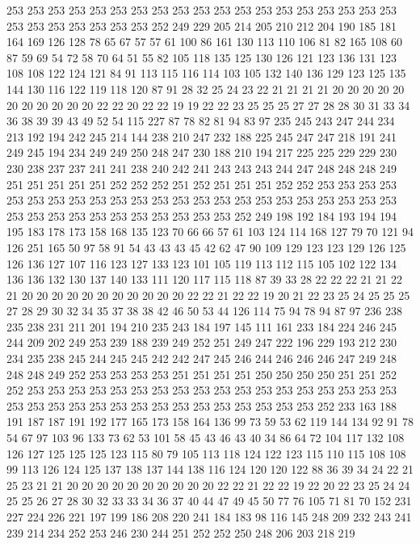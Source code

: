 253 253 253 253 253 253 253 253 253 253 253 253 253 253 253 253 253 253 253 253
253 253 253 253 253 253 252 249 229 205 214 205 210 212 204 190 185 181 164 169
126 128 78 65 67 57 57 61 100 86 161 130 113 110 106 81 82 165 108 60
87 59 69 54 72 58 70 64 51 55 82 105 118 135 125 130 126 121 123 136
131 123 108 108 122 124 121 84 91 113 115 116 114 103 105 132 140 136 129 123
125 135 144 130 116 122 119 118 120 87 91 28 32 25 24 23 22 21 21 21
21 20 20 20 20 20 20 20 20 20 20 20 22 22 20 22 22 19 19 22
22 23 25 25 25 27 27 28 28 30 31 33 34 36 38 39 39 43 49 52
54 115 227 87 78 82 81 94 83 97 235 245 243 247 244 234 213 192 194 242
245 214 144 238 210 247 232 188 225 245 247 247 218 191 241 249 245 194 234 249
249 250 248 247 230 188 210 194 217 225 225 229 229 230 230 238 237 237 241 241
238 240 242 241 243 243 243 244 247 248 248 248 249 251 251 251 251 251 252 252
252 251 252 251 251 251 252 252 253 253 253 253 253 253 253 253 253 253 253 253
253 253 253 253 253 253 253 253 253 253 253 253 253 253 253 253 253 253 253 253
253 253 252 249 198 192 184 193 194 194 195 183 178 173 158 168 135 123 70 66
66 57 61 103 124 114 168 127 79 70 121 94 126 251 165 50 97 58 91 54
43 43 43 45 42 62 47 90 109 129 123 123 129 126 125 126 136 127 107 116
123 127 133 123 101 105 119 113 112 115 105 102 122 134 136 136 132 130 137 140
133 111 120 117 115 118 87 39 33 28 22 22 22 21 21 22 21 20 20 20
20 20 20 20 20 20 20 20 22 22 21 22 22 19 20 21 22 23 25 24
25 25 25 27 28 29 30 32 34 35 37 38 38 42 46 50 53 44 126 114
75 94 78 94 87 97 236 238 235 238 231 211 201 194 210 235 243 184 197 145
111 161 233 184 224 246 245 244 209 202 249 253 239 188 239 249 252 251 249 247
222 196 229 193 212 230 234 235 238 245 244 245 245 242 242 247 245 246 244 246
246 246 247 249 248 248 248 249 252 253 253 253 253 251 251 251 251 250 250 250
250 251 251 252 252 253 253 253 253 253 253 253 253 253 253 253 253 253 253 253
253 253 253 253 253 253 253 253 253 253 253 253 253 253 253 253 253 253 252 233
163 188 191 187 187 191 192 177 165 173 158 164 136 99 73 59 53 62 119 144
134 92 91 78 54 67 97 103 96 133 73 62 53 101 58 45 43 46 43 40
34 86 64 72 104 117 132 108 126 127 125 125 125 123 115 80 79 105 113 118
124 122 123 115 110 115 108 108 99 113 126 124 125 137 138 137 144 138 116 124
120 120 122 88 36 39 34 24 22 21 25 23 21 21 20 20 20 20 20 20
20 20 20 20 22 22 21 22 22 19 22 20 22 23 25 24 24 25 25 26
27 28 30 32 33 33 34 36 37 40 44 47 49 45 50 77 76 105 71 81
70 152 231 227 224 226 221 197 199 186 208 220 241 184 183 98 116 145 248 209
232 243 241 239 214 234 252 253 246 230 244 251 252 252 250 248 206 203 218 219
